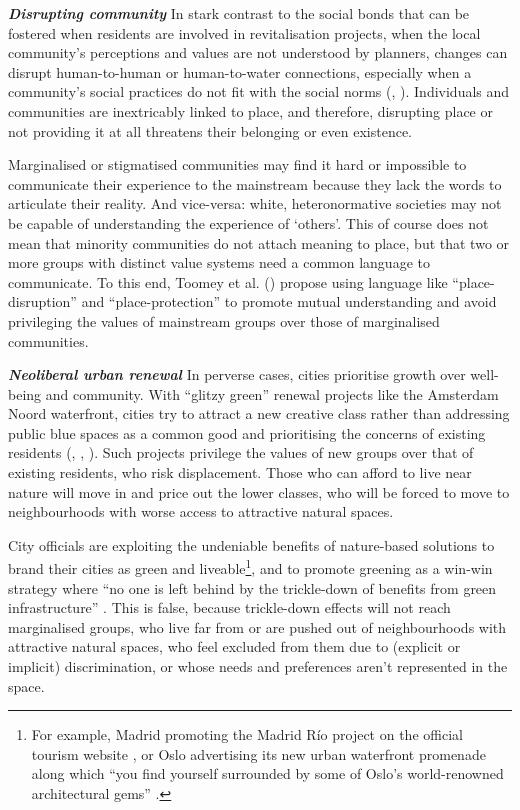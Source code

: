 \documentclass{article}
\newcommand{\bisection}[1]{\textbf{\textit{#1}}}
\begin{document}

\bisection{Disrupting community} 
In stark contrast to the social bonds that can be fostered when residents are involved in revitalisation projects, when the local community's perceptions and values are not understood by planners, changes can disrupt human-to-human or human-to-water connections, especially when a community's social practices do not fit with the social norms (\cite{toomey2021place}, \cite{wessells2014urban}).
Individuals and communities are inextricably linked to place, and therefore, disrupting place or not providing it at all threatens their belonging or even existence.

Marginalised or stigmatised communities may find it hard or impossible to communicate their experience to the mainstream because they lack the words to articulate their reality. And vice-versa: white, heteronormative societies may not be capable of understanding the experience of `others'. This of course does not mean that minority communities do not attach meaning to place, but that two or more groups with distinct value systems need a common language to communicate. To this end, Toomey et al. (\citeyear{toomey2021place}) propose using language like ``place-disruption'' and ``place-protection'' to promote mutual understanding and avoid privileging the values of mainstream groups over those of marginalised communities.


\bisection{Neoliberal urban renewal} 
In perverse cases, cities prioritise growth over well-being and community. With ``glitzy green'' \parencite{anguelovski2021green} renewal projects like the Amsterdam Noord waterfront, cities try to attract a new creative class rather than addressing public blue spaces as a common good and prioritising the concerns of existing residents (\cite{wessells2014urban}, \cite{anguelovski2020expanding}, \cite{del2021dismantling}).
Such projects privilege the values of new groups over that of existing residents, who risk displacement. Those who can afford to live near nature will move in and price out the lower classes, who will be forced to move to neighbourhoods with worse access to attractive natural spaces.

City officials are exploiting the undeniable benefits of nature-based solutions to brand their cities as green and liveable\footnote{For example, Madrid promoting the Madrid Río project on the official tourism website \parencite{madridrio}, or Oslo advertising its new urban waterfront promenade along which ``you find yourself surrounded by some of Oslo's world-renowned architectural gems'' \parencite{visitoslo}.}, and to promote greening as a win-win strategy where ``no one is left behind by the trickle-down of benefits from green infrastructure'' \parencite{anguelovski2021green}. This is false, because trickle-down effects will not reach marginalised groups, who live far from or are pushed out of neighbourhoods with attractive natural spaces, who feel excluded from them due to (explicit or implicit) discrimination, or whose needs and preferences aren't represented in the space.
\end{document}

